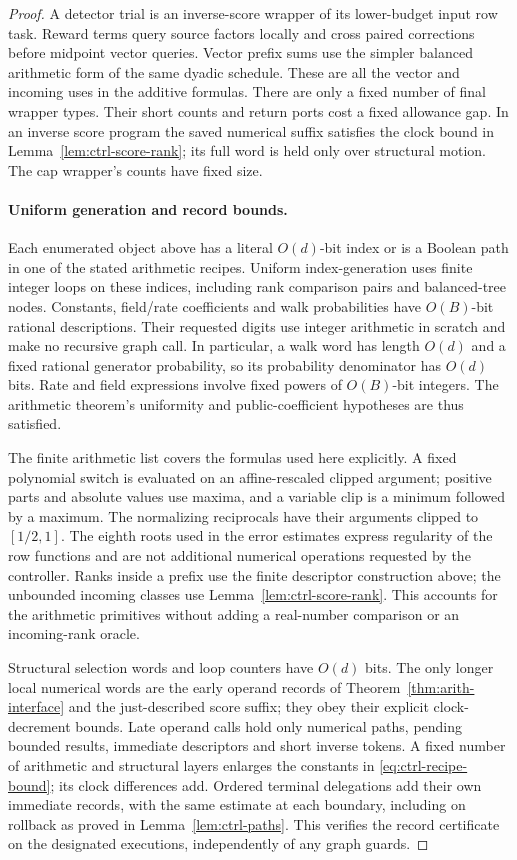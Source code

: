 \begin{proof}
A detector trial is an inverse-score wrapper of its lower-budget
input row task.  Reward terms query source factors locally and cross
paired corrections before midpoint vector queries.  Vector prefix sums
use the simpler balanced arithmetic form of the same dyadic schedule.
These are all the vector and incoming uses in the additive formulas.
There are only a fixed number of final wrapper types.  Their short
counts and return ports cost a fixed allowance gap.  In an inverse
score program the saved numerical suffix satisfies the clock bound in
Lemma~\ref{lem:ctrl-score-rank}; its full word is held only over
structural motion.  The cap wrapper's counts have fixed size.

\paragraph{Uniform generation and record bounds.}
Each enumerated object above has a literal $O(d)$-bit index or is a
Boolean path in one of the stated arithmetic recipes.  Uniform
index-generation uses finite integer loops on these indices, including
rank comparison pairs and balanced-tree nodes.  Constants, field/rate
coefficients and walk probabilities have $O(B)$-bit rational
descriptions.  Their requested digits use integer arithmetic in scratch
and make no recursive graph call.  In particular, a walk word has
length $O(d)$ and a fixed rational generator probability, so its
probability denominator has $O(d)$ bits.  Rate and field expressions
involve fixed powers of $O(B)$-bit integers.  The arithmetic theorem's
uniformity and public-coefficient hypotheses are thus satisfied.

The finite arithmetic list covers the formulas used here explicitly.
A fixed polynomial switch is evaluated on an affine-rescaled clipped
argument; positive parts and absolute values use maxima, and a variable
clip is a minimum followed by a maximum.  The normalizing reciprocals
have their arguments clipped to $[1/2,1]$.  The eighth roots used in the
error estimates express regularity of the row functions and are not
additional numerical operations requested by the controller.  Ranks
inside a prefix use the finite descriptor construction above; the
unbounded incoming classes use Lemma~\ref{lem:ctrl-score-rank}.  This
accounts for the arithmetic primitives without adding a real-number
comparison or an incoming-rank oracle.

Structural selection words and loop counters have $O(d)$ bits.  The
only longer local numerical words are the early operand records of
Theorem~\ref{thm:arith-interface} and the just-described score suffix;
they obey their explicit clock-decrement bounds.  Late operand calls
hold only numerical paths, pending bounded results, immediate
descriptors and short inverse tokens.  A fixed number of arithmetic and
structural layers enlarges the constants in
\eqref{eq:ctrl-recipe-bound}; its clock differences add.  Ordered
terminal delegations add their own immediate records, with the same
estimate at each boundary, including on rollback as proved in
Lemma~\ref{lem:ctrl-paths}.  This verifies the record certificate on
the designated executions, independently of any graph guards.
\end{proof}

